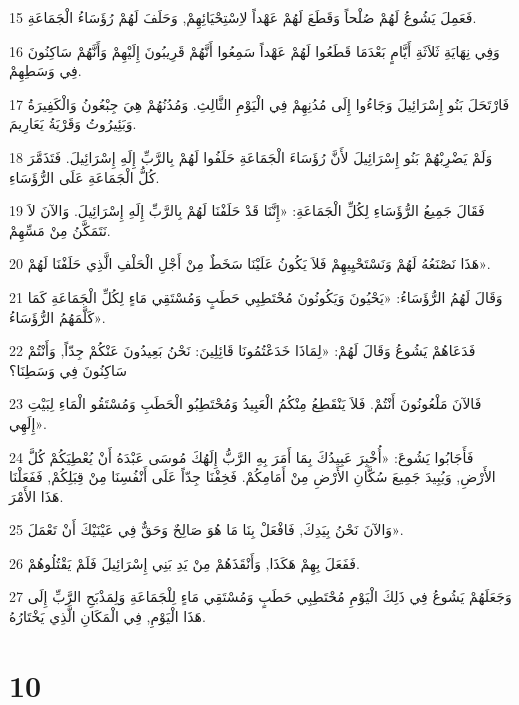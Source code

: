 \par 15 فَعَمِلَ يَشُوعُ لَهُمْ صُلْحاً وَقَطَعَ لَهُمْ عَهْداً لاِسْتِحْيَائِهِمْ, وَحَلَفَ لَهُمْ رُؤَسَاءُ الْجَمَاعَةِ.
\par 16 وَفِي نِهَايَةِ ثَلاَثَةِ أَيَّامٍ بَعْدَمَا قَطَعُوا لَهُمْ عَهْداً سَمِعُوا أَنَّهُمْ قَرِيبُونَ إِلَيْهِمْ وَأَنَّهُمْ سَاكِنُونَ فِي وَسَطِهِمْ.
\par 17 فَارْتَحَلَ بَنُو إِسْرَائِيلَ وَجَاءُوا إِلَى مُدُنِهِمْ فِي الْيَوْمِ الثَّالِثِ. وَمُدُنُهُمْ هِيَ جِبْعُونُ وَالْكَفِيرَةُ وَبَئِيرُوتُ وَقَرْيَةُ يَعَارِيمَ.
\par 18 وَلَمْ يَضْرِبْهُمْ بَنُو إِسْرَائِيلَ لأَنَّ رُؤَسَاءَ الْجَمَاعَةِ حَلَفُوا لَهُمْ بِالرَّبِّ إِلَهِ إِسْرَائِيلَ. فَتَذَمَّرَ كُلُّ الْجَمَاعَةِ عَلَى الرُّؤَسَاءِ.
\par 19 فَقَالَ جَمِيعُ الرُّؤَسَاءِ لِكُلِّ الْجَمَاعَةِ: «إِنَّنَا قَدْ حَلَفْنَا لَهُمْ بِالرَّبِّ إِلَهِ إِسْرَائِيلَ. وَالآنَ لاَ نَتَمَكَّنُ مِنْ مَسِّهِمْ.
\par 20 هَذَا نَصْنَعُهُ لَهُمْ وَنَسْتَحْيِيهِمْ فَلاَ يَكُونُ عَلَيْنَا سَخَطٌ مِنْ أَجْلِ الْحَلْفِ الَّذِي حَلَفْنَا لَهُمْ».
\par 21 وَقَالَ لَهُمُ الرُّؤَسَاءُ: «يَحْيُونَ وَيَكُونُونَ مُحْتَطِبِي حَطَبٍ وَمُسْتَقِي مَاءٍ لِكُلِّ الْجَمَاعَةِ كَمَا كَلَّمَهُمُ الرُّؤَسَاءُ».
\par 22 فَدَعَاهُمْ يَشُوعُ وَقَالَ لَهُمْ: «لِمَاذَا خَدَعْتُمُونَا قَائِلِينَ: نَحْنُ بَعِيدُونَ عَنْكُمْ جِدّاً, وَأَنْتُمْ سَاكِنُونَ فِي وَسَطِنَا؟
\par 23 فَالآنَ مَلْعُونُونَ أَنْتُمْ. فَلاَ يَنْقَطِعُ مِنْكُمُ الْعَبِيدُ وَمُحْتَطِبُو الْحَطَبِ وَمُسْتَقُو الْمَاءِ لِبَيْتِ إِلَهِي».
\par 24 فَأَجَابُوا يَشُوعَ: «أُخْبِرَ عَبِيدُكَ بِمَا أَمَرَ بِهِ الرَّبُّ إِلَهُكَ مُوسَى عَبْدَهُ أَنْ يُعْطِيَكُمْ كُلَّ الأَرْضِ, وَيُبِيدَ جَمِيعَ سُكَّانِ الأَرْضِ مِنْ أَمَامِكُمْ. فَخِفْنَا جِدّاً عَلَى أَنْفُسِنَا مِنْ قِبَلِكُمْ, فَفَعَلْنَا هَذَا الأَمْرَ.
\par 25 وَالآنَ نَحْنُ بِيَدِكَ, فَافْعَلْ بِنَا مَا هُوَ صَالِحٌ وَحَقٌّ فِي عَيْنَيْكَ أَنْ تَعْمَلَ».
\par 26 فَفَعَلَ بِهِمْ هَكَذَا, وَأَنْقَذَهُمْ مِنْ يَدِ بَنِي إِسْرَائِيلَ فَلَمْ يَقْتُلُوهُمْ.
\par 27 وَجَعَلَهُمْ يَشُوعُ فِي ذَلِكَ الْيَوْمِ مُحْتَطِبِي حَطَبٍ وَمُسْتَقِي مَاءٍ لِلْجَمَاعَةِ وَلِمَذْبَحِ الرَّبِّ إِلَى هَذَا الْيَوْمِ, فِي الْمَكَانِ الَّذِي يَخْتَارُهُ.

\chapter{10}

